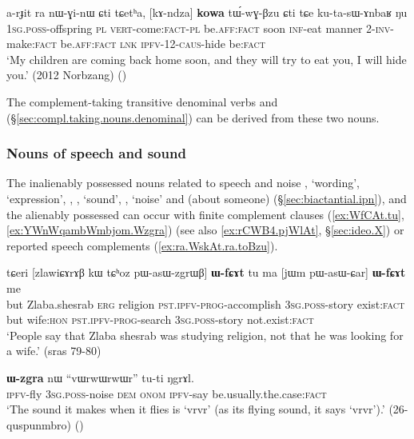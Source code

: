  \begin{exe}
\ex \label{ex:kAndza.kowa.tuwGBzu}
\gll  a-rɟit ra nɯ-ɣi-nɯ ɕti tɕetʰa, [kɤ-ndza] \textbf{kowa} tɯ́-wɣ-βzu ɕti tɕe ku-ta-sɯ-ɤnbaʁ ŋu \\
\textsc{1sg}.\textsc{poss}-offspring \textsc{pl} \textsc{vert}-come:\textsc{fact}-\textsc{pl} be.\textsc{aff}:\textsc{fact} soon \textsc{inf}-eat manner 2-\textsc{inv}-make:\textsc{fact} be.\textsc{aff}:\textsc{fact} \textsc{lnk} \textsc{ipfv}-1\fl{}2-\textsc{caus}-hide be:\textsc{fact} \\
\glt `My children are coming back home soon, and they will try to eat you, I will hide you.' (2012 Norbzang)
()
\end{exe}

The complement-taking transitive denominal verbs  and  (§\ref{sec:compl.taking.nouns.denominal}) can be derived from these two nouns.
 
\subsubsection{Nouns of speech and sound} \label{sec:nouns.speech.complement}
The inalienably possessed nouns related to speech and noise , `wording', `expression', , , `sound', , `noise' and  (about someone) (§\ref{sec:biactantial.ipn}), and the alienably possessed  can occur with finite complement clauses (\ref{ex:WfCAt.tu}, \ref{ex:YWnWqambWmbjom.Wzgra}) (see also \ref{ex:rCWB4.pjWlAt}, §\ref{sec:ideo.X}) or reported speech complements (\ref{ex:ra.WskAt.ra.toBzu}).

\begin{exe}
   \ex  \label{ex:WfCAt.tu}
\gll  tɕeri [zlawiɕɤrɤβ kɯ tɕʰoz pɯ-asɯ-zgrɯβ] \textbf{ɯ-fɕɤt} tu ma [jɯm pɯ-asɯ-ɕar] \textbf{ɯ-fɕɤt} me \\
 but Zlaba.shesrab \textsc{erg} religion \textsc{pst}.\textsc{ipfv}-\textsc{prog}-accomplish  \textsc{3sg}.\textsc{poss}-story
exist:\textsc{fact} but wife:\textsc{hon} \textsc{pst}.\textsc{ipfv}-\textsc{prog}-search  \textsc{3sg}.\textsc{poss}-story not.exist:\textsc{fact} \\
\glt `People say that Zlaba shesrab was studying religion, not that he was looking for a wife.'  (sras 79-80)
\end{exe}

\begin{exe}
   \ex  \label{ex:YWnWqambWmbjom.Wzgra}
\gll [ɲɯ-nɯqambɯmbjom] \textbf{ɯ-zgra} nɯ ``vɯrwɯrwɯr'' tu-ti ŋgrɤl. \\
\textsc{ipfv}-fly \textsc{3sg}.\textsc{poss}-noise \textsc{dem} \textsc{onom} \textsc{ipfv}-say be.usually.the.case:\textsc{fact} \\
\glt `The sound it makes when it flies is `vrvr' (as its flying sound, it says `vrvr').' (26-quspunmbro)
()
\end{exe}
 

